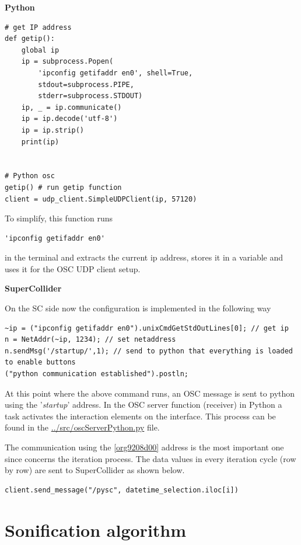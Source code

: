 \documentclass[11pt]{article}
\begin{document}
\textbf{Python}

\begin{verbatim}
# get IP address
def getip():
    global ip
    ip = subprocess.Popen(
        'ipconfig getifaddr en0', shell=True,
        stdout=subprocess.PIPE,
        stderr=subprocess.STDOUT)
    ip, _ = ip.communicate()
    ip = ip.decode('utf-8')
    ip = ip.strip()
    print(ip)


# Python osc
getip() # run getip function
client = udp_client.SimpleUDPClient(ip, 57120)
\end{verbatim}

To simplify, this function runs
\begin{verbatim}
'ipconfig getifaddr en0'
\end{verbatim}
in the terminal and extracts the current ip address, stores it in a variable and uses it for the OSC UDP client setup.

\textbf{SuperCollider}

On the SC side now the configuration is implemented in the following way
\begin{verbatim}
~ip = ("ipconfig getifaddr en0").unixCmdGetStdOutLines[0]; // get ip
n = NetAddr(~ip, 1234); // set netaddress
n.sendMsg('/startup/',1); // send to python that everything is loaded to enable buttons
("python communication established").postln;
\end{verbatim}

At this point where the above command runs, an OSC message is sent to python using the '\emph{startup}' address.  In the OSC server function (receiver) in Python a task activates the interaction elements on the interface.  This process can be found in the \url{../src/oscServerPython.py} file.

The communication using the \ref{org9208d00} address is the most important one since concerns the iteration process.  The data values in every iteration cycle (row by row) are sent to SuperCollider as shown below.

\begin{verbatim}
client.send_message("/pysc", datetime_selection.iloc[i])
\end{verbatim}
\section{Sonification algorithm}
\label{sec:org2dd65e0}
\end{document}
